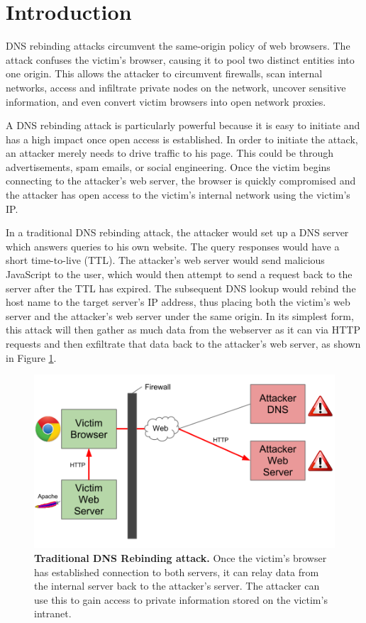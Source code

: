 \section{Introduction}
\label{sec:intro}


DNS rebinding attacks circumvent the same-origin policy of web browsers. The attack confuses the victim's browser, causing it to pool two distinct entities into one origin. This allows the attacker to circumvent firewalls, scan internal networks, access and infiltrate private nodes on the network, uncover sensitive information, and even convert victim browsers into open network proxies.

A DNS rebinding attack is particularly powerful because it is easy to initiate and has a high impact once open access is established. In order to initiate the attack, an attacker merely needs to drive traffic to his page. This could be through advertisements, spam emails, or social engineering. Once the victim begins connecting to the attacker's web server, the browser is quickly compromised and the attacker has open access to the victim's internal network using the victim's IP.

In a traditional DNS rebinding attack, the attacker would set up a DNS server which answers queries to his own website. The query responses would have a short time-to-live (TTL). The attacker's web server would send malicious JavaScript to the user, which would then attempt to send a request back to the server after the TTL has expired. The subsequent DNS lookup would rebind the host name to the target server's IP address, thus placing both the victim's web server and the attacker's web server under the same origin. In its simplest form, this attack will then gather as much data from the webserver as it can via HTTP requests and then exfiltrate that data back to the attacker's web server, as shown in Figure \ref{fig:dnsrebind1}.

\begin{figure}[h]
\centering
\includegraphics[width=0.8\columnwidth]{dnsrebind1.png}
\caption{\textbf{Traditional DNS Rebinding attack.} Once the victim's browser has established connection to both servers, it can relay data from the internal server back to the attacker's server.  The attacker can use this to gain access to private information stored on the victim's intranet.}
\label{fig:dnsrebind1}
\end{figure}


